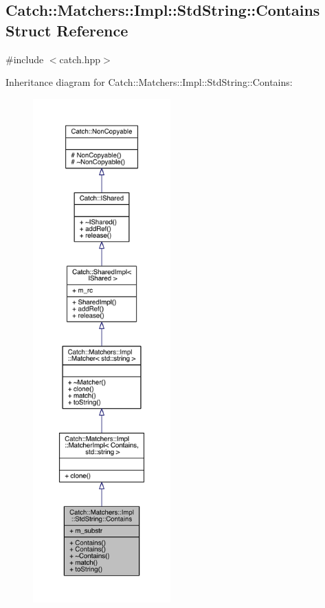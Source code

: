 \hypertarget{a00013}{}\subsection{Catch\+:\+:Matchers\+:\+:Impl\+:\+:Std\+String\+:\+:Contains Struct Reference}
\label{a00013}


{\ttfamily \#include $<$catch.\+hpp$>$}



Inheritance diagram for Catch\+:\+:Matchers\+:\+:Impl\+:\+:Std\+String\+:\+:Contains\+:\nopagebreak
\begin{figure}[H]
\begin{center}
\leavevmode
\includegraphics[height=550pt]{a00348}
\end{center}
\end{figure}


